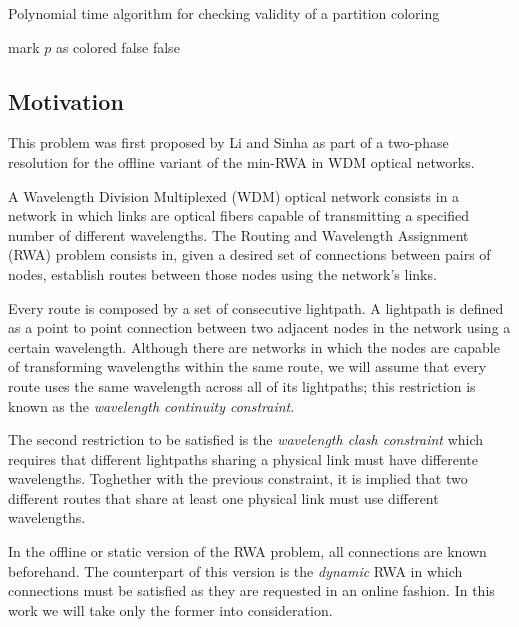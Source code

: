 \begin{algorithm}
\caption{Polynomial time algorithm for checking validity of a partition coloring}
\label{alg:pcpvalidity}
\begin{algorithmic}

			\STATE mark $p$ as colored
					\RETURN false
				\ENDIF	
			\ENDFOR
		\ENDIF
	\ENDFOR
		\RETURN false
	\ENDIF	
\ENDFOR

\end{algorithmic}
\end{algorithm}

\subsection{Motivation}

This problem was first proposed by Li and Sinha \cite{Li00thepartition} as part of a two-phase resolution for the offline variant of the min-RWA in WDM optical networks.

A Wavelength Division Multiplexed (WDM) optical network consists in a network in which links are optical fibers capable of transmitting a specified number of different wavelengths. The Routing and Wavelength Assignment (RWA) problem consists in, given a desired set of connections between pairs of nodes, establish routes between those nodes using the network's links.

Every route is composed by a set of consecutive lightpath. A lightpath is defined as a point to point connection between two adjacent nodes in the network using a certain wavelength. Although there are networks in which the nodes are capable of transforming wavelengths within the same route, we will assume that every route uses the same wavelength across all of its lightpaths; this restriction is known as the \textit{wavelength continuity constraint}.

The second restriction to be satisfied is the \textit{wavelength clash constraint} which requires that different lightpaths sharing a physical link must have differente wavelengths. Toghether with the previous constraint, it is implied that two different routes that share at least one physical link must use different wavelengths.

In the offline or static version of the RWA problem, all connections are known beforehand. The counterpart of this version is the \textit{dynamic} RWA in which connections must be satisfied as they are requested in an online fashion. In this work we will take only the former into consideration.

